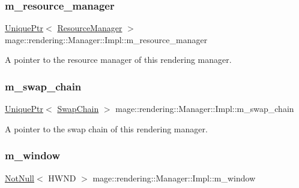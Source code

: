 \subsubsection{\texorpdfstring{m\+\_\+resource\+\_\+manager}{m\_resource\_manager}}
{\footnotesize\ttfamily \hyperlink{namespacemage_a3316d7143a973e37adf1110f2e80ca31}{Unique\+Ptr}$<$ \hyperlink{classmage_1_1rendering_1_1_resource_manager}{Resource\+Manager} $>$ mage\+::rendering\+::\+Manager\+::\+Impl\+::m\+\_\+resource\+\_\+manager\hspace{0.3cm}{\ttfamily [private]}}

A pointer to the resource manager of this rendering manager. \hypertarget{classmage_1_1rendering_1_1_manager_1_1_impl_a6cdd4855cd9c0681ef0b3a5e4f44ad81}{}\label{classmage_1_1rendering_1_1_manager_1_1_impl_a6cdd4855cd9c0681ef0b3a5e4f44ad81} 
\subsubsection{\texorpdfstring{m\+\_\+swap\+\_\+chain}{m\_swap\_chain}}
{\footnotesize\ttfamily \hyperlink{namespacemage_a3316d7143a973e37adf1110f2e80ca31}{Unique\+Ptr}$<$ \hyperlink{classmage_1_1rendering_1_1_swap_chain}{Swap\+Chain} $>$ mage\+::rendering\+::\+Manager\+::\+Impl\+::m\+\_\+swap\+\_\+chain\hspace{0.3cm}{\ttfamily [private]}}

A pointer to the swap chain of this rendering manager. \hypertarget{classmage_1_1rendering_1_1_manager_1_1_impl_a9e08221306f4931b1da16fe5b021a5e8}{}\label{classmage_1_1rendering_1_1_manager_1_1_impl_a9e08221306f4931b1da16fe5b021a5e8} 
\subsubsection{\texorpdfstring{m\+\_\+window}{m\_window}}
{\footnotesize\ttfamily \hyperlink{namespacemage_a8769f9d670d6b585ea306cb1062af94b}{Not\+Null}$<$ H\+W\+ND $>$ mage\+::rendering\+::\+Manager\+::\+Impl\+::m\+\_\+window\hspace{0.3cm}{\ttfamily [private]}}

